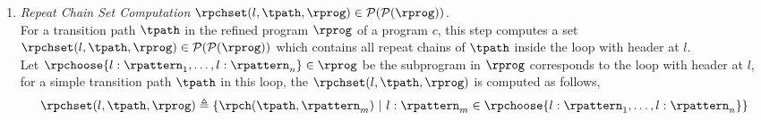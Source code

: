 \begin{enumerate}
%
\item 
\emph{Repeat Chain Set Computation}
$\rpchset(l, \tpath, \rprog) \in \mathcal{P}(\mathcal{P}(\rprog))$.
\\
For a transition path $\tpath$ in the refined program $\rprog$ of a program $c$, 
this step computes a set 
$\rpchset(l, \tpath, \rprog) \in \mathcal{P}(\mathcal{P}(\rprog))$
which contains
 all repeat chains of $\tpath$ inside the loop with header at $l$.
 \\
Let $\rpchoose{l: \rpattern_1, \ldots, l: \rpattern_n}  \in \rprog$
be the subprogram in $\rprog$ corresponds to the  loop with header at $l$, for a simple transition path $\tpath$ in this loop,
the $\rpchset(l, \tpath, \rprog)$ is computed as follows,
 \[
    \rpchset(l, \tpath, \rprog) \triangleq \left\{\rpch(\tpath, \rpattern_m)
    ~\middle\vert~
    l : \rpattern_m \in \rpchoose{l: \rpattern_1, \ldots, l: \rpattern_n} 
    \right\}
 \]
%
  

\end{enumerate}
